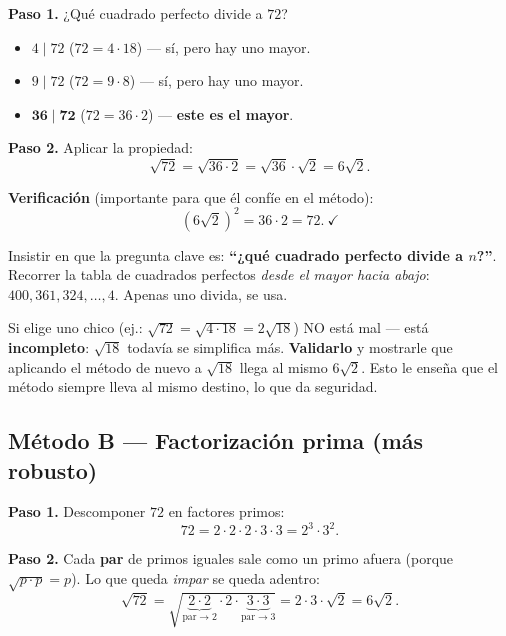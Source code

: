 \documentclass[11pt,a4paper]{article}
\begin{document}
\begin{tcolorbox}[ejemplo, title={Ejemplo guiado: $\sqrt{72}$}]
\textbf{Paso 1.} ¿Qué cuadrado perfecto divide a $72$?
\begin{itemize}[nosep]
  \item $4 \mid 72$ ($72 = 4 \cdot 18$) --- sí, pero hay uno mayor.
  \item $9 \mid 72$ ($72 = 9 \cdot 8$) --- sí, pero hay uno mayor.
  \item $\mathbf{36 \mid 72}$ ($72 = 36 \cdot 2$) --- \textbf{este es el mayor}.
\end{itemize}

\textbf{Paso 2.} Aplicar la propiedad:
\[
  \sqrt{72} = \sqrt{36 \cdot 2} = \sqrt{36} \cdot \sqrt{2} = 6\sqrt{2}.
\]

\textbf{Verificación} (importante para que él confíe en el método):
\[
  (6\sqrt{2})^{2} = 36 \cdot 2 = 72.\ \checkmark
\]
\end{tcolorbox}

\begin{tcolorbox}[guia-tutor, title={\color{tutormorado} CÓMO HACERLE LLEGAR EL MÉTODO A}]
Insistir en que la pregunta clave es: \textbf{``¿qué cuadrado perfecto divide a $n$?''}. Recorrer la tabla de cuadrados perfectos \emph{desde el mayor hacia abajo}: $400, 361, 324, \ldots, 4$. Apenas uno divida, se usa.

Si elige uno chico (ej.: $\sqrt{72} = \sqrt{4 \cdot 18} = 2\sqrt{18}$) NO está mal --- está \textbf{incompleto}: $\sqrt{18}$ todavía se simplifica más. \textbf{Validarlo} y mostrarle que aplicando el método de nuevo a $\sqrt{18}$ llega al mismo $6\sqrt{2}$. Esto le enseña que el método siempre lleva al mismo destino, lo que da seguridad.
\end{tcolorbox}

\subsection{Método B --- Factorización prima (más robusto)}

\begin{tcolorbox}[ejemplo, title={Ejemplo guiado: $\sqrt{72}$ con primos}]
\textbf{Paso 1.} Descomponer $72$ en factores primos:
\[
  72 = 2 \cdot 2 \cdot 2 \cdot 3 \cdot 3 = 2^{3} \cdot 3^{2}.
\]

\textbf{Paso 2.} Cada \textbf{par} de primos iguales sale como un primo afuera (porque $\sqrt{p \cdot p} = p$). Lo que queda \emph{impar} se queda adentro:
\[
  \sqrt{72} = \sqrt{\underbrace{2 \cdot 2}_{\text{par} \to 2} \cdot 2 \cdot \underbrace{3 \cdot 3}_{\text{par} \to 3}}
            = 2 \cdot 3 \cdot \sqrt{2} = 6\sqrt{2}.
\]
\end{tcolorbox}
\end{document}
